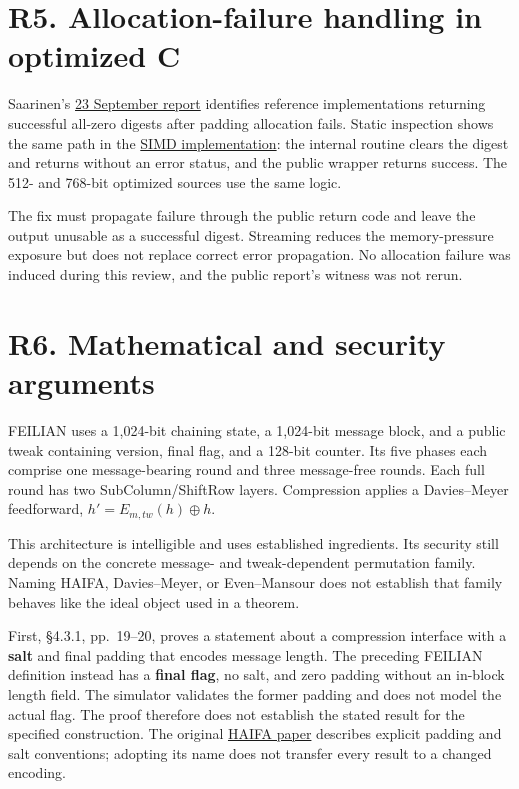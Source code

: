 \documentclass[
  english,
  11pt,
  a4paper,
]{article}
\begin{document}
\section{R5. Allocation-failure handling in optimized
C}\label{r5.-allocation-failure-handling-in-optimized-c}

Saarinen's \href{https://ngcc.dev/reports/hash-10.html}{23 September
report} identifies reference implementations returning successful
all-zero digests after padding allocation fails. Static inspection shows
the same path in the \href{data/SOURCES.md\#source-12}{SIMD
implementation}: the internal routine clears the digest and returns
without an error status, and the public wrapper returns success. The
512- and 768-bit optimized sources use the same logic.

The fix must propagate failure through the public return code and leave
the output unusable as a successful digest. Streaming reduces the
memory-pressure exposure but does not replace correct error propagation.
No allocation failure was induced during this review, and the public
report's witness was not rerun.


\section{R6. Mathematical and security
arguments}\label{r6.-mathematical-and-security-arguments}

FEILIAN uses a 1,024-bit chaining state, a 1,024-bit message block, and
a public tweak containing version, final flag, and a 128-bit counter.
Its five phases each comprise one message-bearing round and three
message-free rounds. Each full round has two SubColumn/ShiftRow layers.
Compression applies a Davies--Meyer feedforward,
\(h' = E_{m,tw}(h) \oplus h\).

This architecture is intelligible and uses established ingredients. Its
security still depends on the concrete message- and tweak-dependent
permutation family. Naming HAIFA, Davies--Meyer, or Even--Mansour does
not establish that family behaves like the ideal object used in a
theorem.

First, §4.3.1, pp.~19--20, proves a statement about a compression
interface with a \textbf{salt} and final padding that encodes message
length. The preceding FEILIAN definition instead has a \textbf{final
flag}, no salt, and zero padding without an in-block length field. The
simulator validates the former padding and does not model the actual
flag. The proof therefore does not establish the stated result for the
specified construction. The original
\href{https://eprint.iacr.org/2007/278.pdf}{HAIFA paper} describes
explicit padding and salt conventions; adopting its name does not
transfer every result to a changed encoding.
\end{document}
